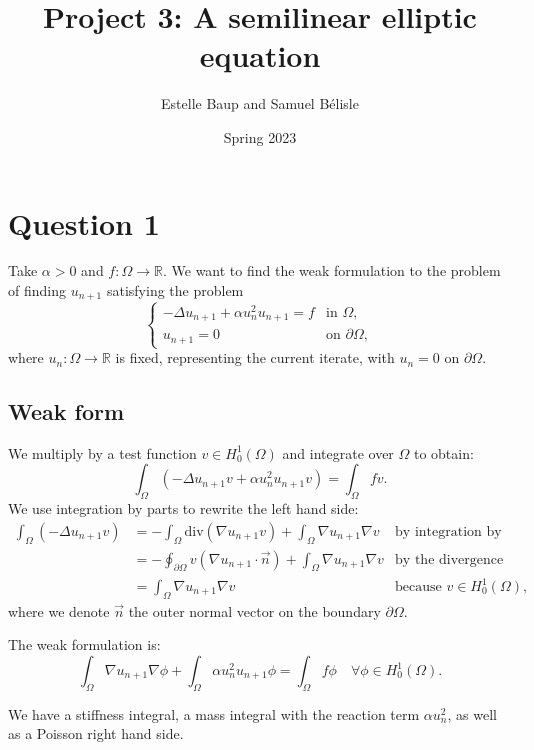 \documentclass[11pt, a4paper, twoside]{article}
\newcommand{\R}{\mathbb{R}} %
\newcommand{\grad}{\nabla} %
\renewcommand{\div}{\text{div}} %
\newcommand{\Hunz}{H^1_0(\Omega)}
\newcommand{\intom}{\int_\Omega}
\newcommand{\intbd}{\oint_{\partial \Omega}}
\begin{document}
\title{Project 3: A semilinear elliptic equation}
\author{Estelle Baup and Samuel Bélisle}
\date{Spring 2023}
\maketitle 

\section*{Question 1}
Take $\alpha > 0$ and $f : \Omega \to \R$.
We want to find the weak formulation to the problem of finding $u_{n+1}$ satisfying the problem
$$\begin{cases}  - \Delta u_{n+1} + \alpha u_n^2 u_{n+1} = f & \text{in } \Omega,\\
u_{n+1} = 0 &\text{on } \partial\Omega,
\end{cases}$$
where $u_n : \Omega \to \R$ is fixed, representing the current iterate, with $u_n = 0$ on $\partial\Omega$.

\subsection*{Weak form}
We multiply by a test function $v\in \Hunz$ and integrate over $\Omega$ to obtain:
$$\intom \left( -\Delta u_{n+1} v + \alpha u_n^2 u_{n+1} v \right) = \intom fv .$$
We use integration by parts to rewrite the left hand side:
\begin{align*}
 \intom (-\Delta u_{n+1} v)
 &= - \intom \div(\grad u_{n+1} v) + \intom \grad u_{n+1} \grad v
 	&\text{by integration by part}
 \\%
 &= - \intbd v (\grad u_{n+1} \cdot \vec n) + \intom \grad u_{n+1} \grad v
 	&\text{by the divergence theorem}
 \\%
 &=  \intom \grad u_{n+1} \grad v
 	&\text{because } v\in\Hunz,
\end{align*}
where we denote $\vec n$ the outer normal vector on the boundary $\partial \Omega$.

The weak formulation is:
\begin{equation}
\label{weak_f} \tag{E1}
\intom
\grad u_{n+1} \grad \phi
+ 
\intom
\alpha u_n^2 u_{n+1} \phi
= \intom f\phi
\quad \forall \phi \in\Hunz.
\end{equation}

We have a stiffness integral, a mass integral with the reaction term $\alpha u_n^2$, as well as a Poisson right hand side.
\end{document}
